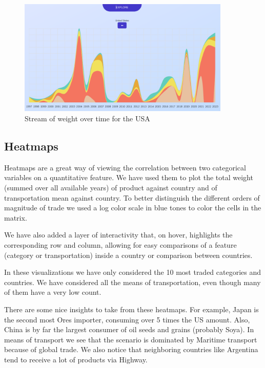 \documentclass[12pt,a4]{article}
\begin{document}
\begin{figure}[H]
    \centering
    \includegraphics[width=0.9\textwidth]{assets/stream2.png}
    \caption{Stream of weight over time for the USA}
\end{figure}

\subsection{Heatmaps}
Heatmaps are a great way of viewing the correlation between two categorical variables on a quantitative feature. We have used them to plot the total weight (summed over all available years) of product against country and of transportation mean against country. To better distinguish the different orders of magnitude of trade we used a log color scale in blue tones to color the cells in the matrix.

We have also added a layer of interactivity that, on hover, highlights the corresponding row and column, allowing for easy comparisons of a feature (category or transportation) inside a country or comparison between countries.

In these visualizations we have only considered the 10 most traded categories and countries. We have considered all the means of transportation, even though many of them have a very low count.

There are some nice insights to take from these heatmaps. For example, Japan is the second most Ores importer, consuming over 5 times the US amount. Also, China is by far the largest consumer of oil seeds and grains (probably Soya).  In means of transport we see that the scenario is dominated by Maritime transport because of global trade. We also notice that neighboring countries like Argentina tend to receive a lot of products via Highway.
\end{document}
